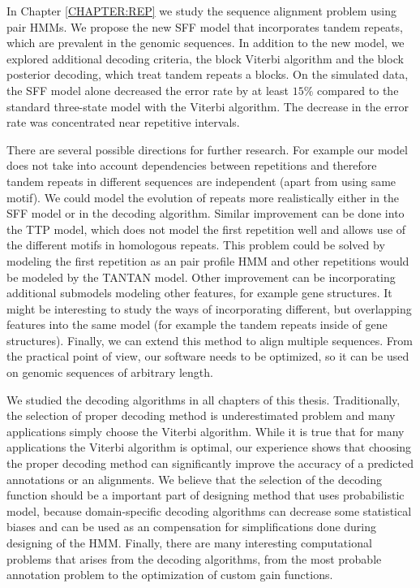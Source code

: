 In Chapter \ref{CHAPTER:REP} we study the sequence alignment problem using pair
HMMs. We propose the new SFF model that incorporates tandem repeats, which are
prevalent in the genomic sequences. In addition to the new model, we explored
additional decoding criteria, the block Viterbi algorithm and the block
posterior decoding, which treat tandem repeats a blocks. On the simulated data,
the SFF model alone decreased the error rate by at least $15\%$  compared to
the standard three-state model with the Viterbi algorithm. The decrease in the
error rate was  concentrated near repetitive intervals. 

There are several possible directions for further research. For example our
model does not take into account dependencies between repetitions and therefore
tandem repeats in different sequences are independent (apart from using same
motif). We could model the evolution of repeats more realistically either in
the SFF model or in the decoding algorithm.  Similar improvement can be done
into the TTP model, which does not model the first repetition well and allows
use of the different motifs in homologous repeats. This problem could be solved
by modeling the first repetition as an pair profile HMM and other repetitions
would be modeled by the TANTAN model.  Other improvement can be incorporating
additional submodels modeling other features, for example gene structures. It
might be interesting to study the ways of incorporating different, but
overlapping features into the same model (for example the tandem repeats inside
of gene structures).  Finally, we can extend this method to align multiple
sequences. From the practical point of view, our software needs to be
optimized, so it can be used on genomic sequences of arbitrary length.

We studied the decoding algorithms in all chapters of this thesis.
Traditionally, the selection of proper decoding method is underestimated
problem and many applications simply choose the Viterbi algorithm. While it is
true that for many applications the Viterbi algorithm is optimal,  our
experience shows that choosing the proper decoding method can significantly
improve the accuracy of a predicted annotations or an alignments. We believe
that the selection of the decoding function should be a important part of
designing method that uses probabilistic model, because domain-specific
decoding algorithms can decrease some statistical biases and can be used as an
compensation for simplifications done during designing of the HMM. Finally,
there are many interesting computational problems that arises from the decoding
algorithms, from the most probable annotation problem to the optimization of
custom gain functions.

\label{LastPage}
